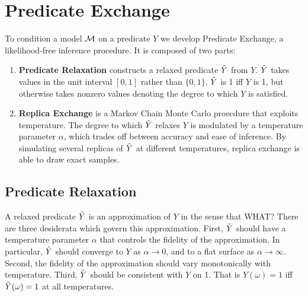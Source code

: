 \section{Predicate Exchange}
To condition a model ${\mathcal{M}}$ on a predicate $Y$ we develop Predicate Exchange, a likelihood-free inference procedure.  It is composed of two parts:
\begin{enumerate}
\item \textbf{Predicate Relaxation} constructs a relaxed predicate $\tilde{Y}$ from $Y$. $\tilde{Y}$ takes values in the unit interval $[0, 1]$ rather than $\{0, 1\}$.
$\tilde{Y}$ is 1 iff $Y$ is 1, but otherwise takes nonzero values denoting the degree to which $Y$ is satisfied.
\item  \textbf{Replica Exchange} is a Markov Chain Monte Carlo proecdure that exploits temperature. The degree to which $\tilde{Y}$ relaxes $Y$ is modulated by a temperature parameter $\alpha$, which trades off between accuracy and ease of inference.  By simulating several replicas of $\tilde{Y}$ at different temperatures, replica exchange is able to draw exact samples. 
\end{enumerate}

\subsection{Predicate Relaxation}

A relaxed predicate $\tilde{Y}$ is an approximation of $Y$ in the sense that WHAT?
There are three desiderata which govern this approximation.
First, $\tilde{Y}$ should have a temperature parameter $\alpha$ that controls the fidelity of the approximation. In particular, $\tilde{Y}$ should converge to $Y$ as $\alpha \to 0$, and to a flat surface as $\alpha \to \infty$. Second, the fidelity of the approximation should vary monotonically with temperature. Third, $\tilde{Y}$ should be consistent with $Y$ on 1. That is $Y(\omega) = 1$ iff $\tilde{Y}(\omega) = 1$ at all temperatures.  



